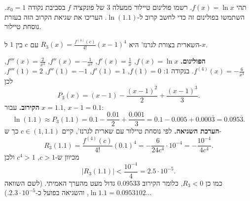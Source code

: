 
\begin{question}
תהי $f(x)=\ln x$. רשמו פולינום טיילור ממעלה 3 של פונקציה $f$ בסביבת נקודה $x_0=1$. השתמשו בפולינום זה כדי לחשב קרוב ל-$\ln(1.1)$. העריכו את שגיאת הקרוב הזה בעזרת נוסחת טיילור.
\end{question}

\begin{hint}
השארית בצורת לגרנז' היא $R_3(x)=\frac{f^{(4)}(c)}{4!}(x-1)^4$ עם $c$ בין $1$ ל-$x$.
\end{hint}

\begin{solution}
\textbf{הפולינום.} $f(x)=\ln x$, $f'(x)=\frac1x$, $f''(x)=-\frac1{x^2}$, $f'''(x)=\frac2{x^3}$, $f^{(4)}(x)=-\frac6{x^4}$. בנקודה $1$: $f(1)=0$, $f'(1)=1$, $f''(1)=-1$, $f'''(1)=2$. לכן
\[ P_3(x)=(x-1)-\frac{(x-1)^2}{2}+\frac{(x-1)^3}{3}. \]
\textbf{הקירוב.} עבור $x=1.1$, $x-1=0.1$:
\[ \ln(1.1)\approx P_3(1.1)=0.1-\frac{0.01}{2}+\frac{0.001}{3}=0.1-0.005+0.000\overline{3}=0.095\overline{3}. \]
\textbf{הערכת השגיאה.} לפי נוסחת טיילור עם שארית לגרנז', קיים $c\in(1,1.1)$ כך ש-
\[ R_3(1.1)=\frac{f^{(4)}(c)}{4!}(0.1)^4=-\frac{6}{24c^4}\cdot10^{-4}=-\frac{10^{-4}}{4c^4}. \]
מכיוון ש-$c>1$, $c^4>1$ ולכן
\[ |R_3(1.1)|<\frac{10^{-4}}{4}=2.5\cdot10^{-5}. \]
כמו כן $R_3<0$, כלומר הקירוב $0.09533$ גדול מעט מהערך האמיתי. (לשם השוואה $\ln1.1=0.0953102\ldots$, והשגיאה בפועל כ-$2.3\cdot10^{-5}$.)
\end{solution}
